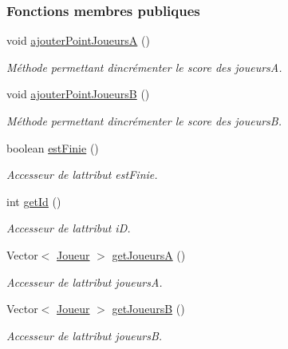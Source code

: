 \subsubsection*{Fonctions membres publiques}
\begin{DoxyCompactItemize}
\item 
void \hyperlink{classcom_1_1example_1_1area_1_1_partie_abb040a8be4a92a91afded80991d07087}{ajouter\+Point\+JoueursA} ()
\begin{DoxyCompactList}\small\item\em Méthode permettant d\textquotesingle{}incrémenter le score des joueursA. \end{DoxyCompactList}\item 
void \hyperlink{classcom_1_1example_1_1area_1_1_partie_aadc82cc11b982008b81f886adbc4e63a}{ajouter\+Point\+JoueursB} ()
\begin{DoxyCompactList}\small\item\em Méthode permettant d\textquotesingle{}incrémenter le score des joueursB. \end{DoxyCompactList}\item 
boolean \hyperlink{classcom_1_1example_1_1area_1_1_partie_ab0dd955a65440cab1569311ff35de3eb}{est\+Finie} ()
\begin{DoxyCompactList}\small\item\em Accesseur de l\textquotesingle{}attribut est\+Finie. \end{DoxyCompactList}\item 
int \hyperlink{classcom_1_1example_1_1area_1_1_partie_a535a67141814a238c1ffc0c42d0afedc}{get\+Id} ()
\begin{DoxyCompactList}\small\item\em Accesseur de l\textquotesingle{}attribut iD. \end{DoxyCompactList}\item 
Vector$<$ \hyperlink{classcom_1_1example_1_1area_1_1_joueur}{Joueur} $>$ \hyperlink{classcom_1_1example_1_1area_1_1_partie_a0f944de317206d9b99f9ffc7146a43ef}{get\+JoueursA} ()
\begin{DoxyCompactList}\small\item\em Accesseur de l\textquotesingle{}attribut joueursA. \end{DoxyCompactList}\item 
Vector$<$ \hyperlink{classcom_1_1example_1_1area_1_1_joueur}{Joueur} $>$ \hyperlink{classcom_1_1example_1_1area_1_1_partie_a3c6b981de54d03eeb553919983ee3be8}{get\+JoueursB} ()
\begin{DoxyCompactList}\small\item\em Accesseur de l\textquotesingle{}attribut joueursB. \end{DoxyCompactList}\item 

\end{DoxyCompactItemize}
